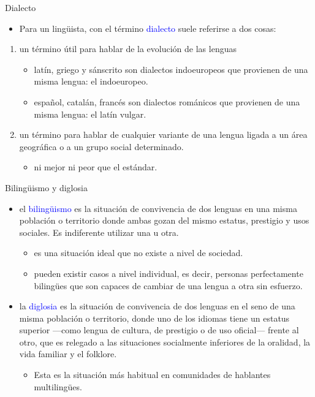 \documentclass[handout]{beamer}
\begin{document}
\begin{frame}{Dialecto}
\begin{itemize}
	\item Para un lingüista, con el término \textcolor{blue}{dialecto} suele referirse a dos cosas:
\end{itemize}
\begin{enumerate}
	\item un término útil para hablar de la evolución de las lenguas
	\begin{itemize}
		\item latín, griego y sánscrito son dialectos indoeuropeos que provienen de una misma lengua: el indoeuropeo.
		\item español, catalán, francés son dialectos románicos que provienen de una misma lengua: el latín vulgar.
	\end{itemize}
	\item un término para hablar de cualquier variante de una lengua ligada a un área geográfica o a un grupo social determinado. 
	\begin{itemize}
		\item ni mejor ni peor que el estándar.
	\end{itemize}
\end{enumerate}

\end{frame}

\begin{frame}{Bilingüismo y diglosia}

\begin{itemize}
	\item el \textcolor{blue}{bilingüismo} es la situación de convivencia de dos lenguas en una misma población o territorio donde ambas gozan del mismo estatus, prestigio y usos sociales. Es indiferente utilizar una u otra.
	\begin{itemize}
		\item es una situación ideal que no existe a nivel de sociedad.
		\item pueden existir casos a nivel individual, es decir, personas perfectamente bilingües que son capaces de cambiar de una lengua a otra sin esfuerzo.
	\end{itemize}
	\item la \textcolor{blue}{diglosia} es la situación de convivencia de dos lenguas en el seno de una misma población o territorio, donde uno de los idiomas tiene un estatus superior —como lengua de cultura, de prestigio o de uso oficial— frente al otro, que es relegado a las situaciones socialmente inferiores de la oralidad, la vida familiar y el folklore.
	\begin{itemize}
		\item Esta es la situación más habitual en comunidades de hablantes multilingües.
	\end{itemize}
\end{itemize}

\end{frame}
\end{document}
